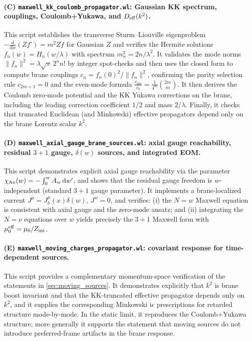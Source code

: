 \documentclass[11pt]{article}
\newcommand{\dd}{\mathrm d}
\newcommand{\ii}{\mathrm i}
\newcommand{\A}{A}
\newcommand{\J}{J}
\newcommand{\Z}{Z}
\newcommand{\lam}{\lambda}      %
\newcommand{\Zint}{Z_{\rm int}} %
\newcommand{\muo}{\mu_0}
\newcommand{\mueff}{\mu_0^{\rm eff}}
\begin{document}
\paragraph{(C) \texttt{maxwell\_kk\_coulomb\_propagator.wl}: Gaussian KK spectrum, couplings, Coulomb+Yukawa, and \(D_{\rm eff}(k^2)\).}
This script establishes the transverse Sturm--Liouville eigenproblem
\(-\frac{\dd}{\dd w}(\Z f')=m^2\Z f\) for Gaussian \(\Z\) and verifies the Hermite
solutions \(f_n(w)=H_n(w/\lam)\) with spectrum \(m_n^2=2n/\lam^2\). It validates the
mode norms \(\|f_n\|^2=\lam\sqrt{\pi}\,2^n n!\) by integer spot-checks and then
uses the closed form to compute brane couplings
\(c_n=f_n(0)^2/\|f_n\|^2\), confirming the parity selection rule \(c_{2m+1}=0\) and
the even-mode formula \(\frac{c_{2m}}{c_0}=\frac{1}{4^m}\binom{2m}{m}\). It then
derives the Coulomb zero-mode potential and the KK Yukawa corrections on the
brane, including the leading correction coefficient \(1/2\) and mass \(2/\lam\).
Finally, it checks that truncated Euclidean (and Minkowski) effective propagators
depend only on the brane Lorentz scalar \(k^2\).

\paragraph{(D) \texttt{maxwell\_axial\_gauge\_brane\_sources.wl}: axial gauge reachability, residual \(3+1\) gauge, \(\delta(w)\) sources, and integrated EOM.}
This script demonstrates explicit axial gauge reachability via the parameter
\(\chi_{\rm Ax}(w)=-\int_0^w \A_w\,\dd w'\), and shows that the residual gauge
freedom is \(w\)-independent (standard \(3+1\) gauge parameter). It implements a
brane-localized current \(\J^\mu=\J_b^\mu(x)\delta(w)\), \(\J^w=0\), and verifies:
(i) the \(N=w\) Maxwell equation is consistent with axial gauge and the zero-mode
ansatz; and (ii) integrating the \(N=\nu\) equations over \(w\) yields precisely
the \(3+1\) Maxwell form with \(\mueff=\muo/\Zint\).

\paragraph{(E) \texttt{maxwell\_moving\_charges\_propagator.wl}: covariant response for time-dependent sources.}
This script provides a complementary momentum-space verification of the statements
in \cref{sec:moving_sources}. It demonstrates explicitly that \(k^2\) is brane
boost invariant and that the KK-truncated effective propagator depends only on
\(k^2\), and it supplies the corresponding Minkowski \(\ii\epsilon\) prescriptions
for retarded structure mode-by-mode. In the static limit, it reproduces the
Coulomb+Yukawa structure; more generally it supports the statement that moving
sources do not introduce preferred-frame artifacts in the brane response.
\end{document}
